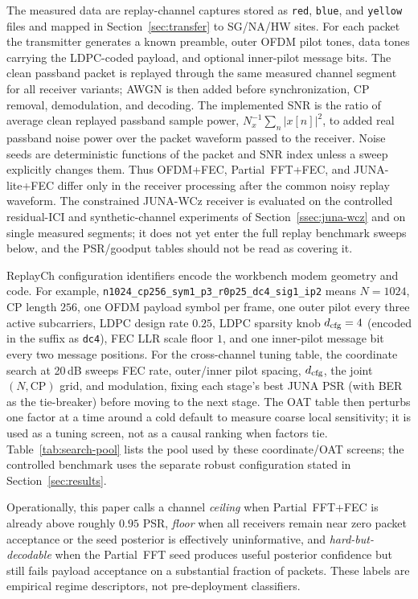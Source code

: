 \documentclass[journal]{IEEEtran}
\newcommand{\cfg}[1]{\texttt{#1}}
\newcommand{\junalite}{JUNA-lite}
\newcommand{\junawcz}{JUNA-WCz}
\begin{document}
The measured data are replay-channel captures stored as \texttt{red},
\texttt{blue}, and \texttt{yellow} files and mapped in Section~\ref{sec:transfer}
to SG/NA/HW sites. For each packet the transmitter generates a known preamble,
outer OFDM pilot tones, data tones carrying the LDPC-coded payload, and optional
inner-pilot message bits. The clean passband packet is replayed through the same
measured channel segment for all receiver variants; AWGN is then added before
synchronization, CP removal, demodulation, and decoding. The implemented SNR is
the ratio of average clean replayed passband sample power,
$N_x^{-1}\sum_n |x[n]|^2$,
to added real passband noise power over the packet waveform passed to the
receiver. Noise seeds are deterministic functions of the packet and SNR index
unless a sweep explicitly changes them. Thus OFDM+FEC, Partial~FFT+FEC, and
\junalite{}+FEC differ only in the receiver processing after the common noisy
replay waveform. The constrained \junawcz{} receiver is evaluated on the
controlled residual-ICI and synthetic-channel experiments of
Section~\ref{ssec:juna-wcz} and on single measured segments; it does not yet
enter the full replay benchmark sweeps below, and the PSR/goodput tables should
not be read as covering it.

ReplayCh configuration identifiers encode the workbench modem geometry and code. For example,
\cfg{n1024\_cp256\_sym1\_p3\_r0p25\_dc4\_sig1\_ip2} means
$N=1024$, CP length $256$, one OFDM payload symbol per frame, one outer pilot
every three active subcarriers, LDPC design rate $0.25$, LDPC sparsity knob
$d_{\rm cfg}=4$ (encoded in the suffix as \cfg{dc4}), FEC LLR scale floor $1$,
and one inner-pilot message bit every two message positions. For the
cross-channel tuning table, the coordinate search at 20\,dB sweeps FEC rate,
outer/inner pilot spacing, $d_{\rm cfg}$, the joint $(N,\mathrm{CP})$ grid, and
modulation, fixing each stage's best JUNA PSR (with BER as the tie-breaker)
before moving to the next stage. The OAT table then perturbs one factor at a
time around a cold default to measure coarse local sensitivity; it is used as a
tuning screen, not as a causal ranking when factors tie. Table~\ref{tab:search-pool}
lists the pool used by these coordinate/OAT screens; the controlled benchmark
uses the separate robust configuration stated in Section~\ref{sec:results}.

Operationally, this paper calls a channel \emph{ceiling} when Partial~FFT+FEC is
already above roughly $0.95$ PSR, \emph{floor} when all receivers remain near zero
packet acceptance or the seed posterior is effectively uninformative, and
\emph{hard-but-decodable} when the Partial~FFT seed produces useful posterior
confidence but still fails payload acceptance on a substantial fraction of
packets. These labels are empirical regime descriptors, not pre-deployment
classifiers.
\end{document}
